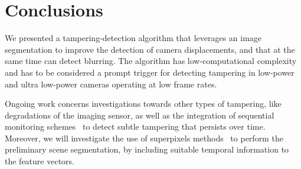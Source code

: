 \documentclass{llncs}
\begin{document}
\section{Conclusions}\label{sec:Conclusion}
\vspace{-0.1cm}
We presented a tampering-detection algorithm that leverages an image segmentation to improve the detection of camera displacements, and that at the same time can detect blurring. The algorithm has low-computational complexity and has to be considered a prompt trigger for detecting tampering in low-power and ultra low-power cameras operating at low frame rates.

Ongoing work concerns investigations towards other types of tampering, like degradations of the imaging sensor, as well as the integration of sequential monitoring schemes~\cite{alippi2010detecting} to detect subtle tampering that persists over time. Moreover, we will investigate the use of superpixels methods~\cite{Susstrunk2012} to perform the preliminary scene segmentation, by including suitable temporal information to the feature vectors.








%	
%	
\end{document}
